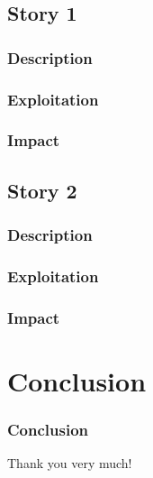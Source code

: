 \documentclass{beamer}
\begin{document}
\subsection{Story 1}

\begin{frame}
  \frametitle{Description}
\end{frame}

\begin{frame}
  \frametitle{Exploitation}
\end{frame}

\begin{frame}
  \frametitle{Impact}
\end{frame}


\subsection{Story 2}

\begin{frame}
  \frametitle{Description}
\end{frame}

\begin{frame}
  \frametitle{Exploitation}
\end{frame}

\begin{frame}
  \frametitle{Impact}
\end{frame}

\section*{Conclusion}

\begin{frame}
  \frametitle{Conclusion}
  \begin{center}
    Thank you very much!
  \end{center}
\end{frame}
\end{document}
